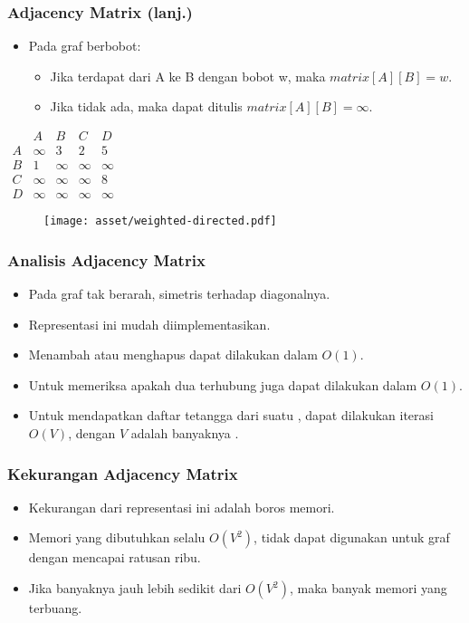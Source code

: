 \begin{frame}
\frametitle{Adjacency Matrix (lanj.)}
\begin{itemize}
  \item Pada graf berbobot:
  \begin{itemize}
    \item Jika terdapat \fedge dari A ke B dengan bobot w, maka $matrix[A][B] = w$. 
    \item Jika tidak ada, maka dapat ditulis $matrix[A][B] = \infty$.
  \end{itemize}
\end{itemize}

\begin{center}
\begin{multicols}{2}
  $\begin{array}{c|cccc}
      & A & B & C & D \\ \hline
    A & \infty & 3 & 2 & 5 \\
    B & 1 & \infty & \infty & \infty \\
    C & \infty & \infty & \infty & 8 \\
    D & \infty & \infty & \infty & \infty
  \end{array}$
  \break
  \begin{figure}
    \texttt{[image: asset/weighted-directed.pdf]}
  \end{figure}
\end{multicols} 
\end{center}
\end{frame}

\begin{frame}
\frametitle{Analisis Adjacency Matrix}
\begin{itemize}
  \item Pada graf tak berarah, \fadjacencymatrix simetris terhadap diagonalnya.
  \item Representasi ini mudah diimplementasikan.
  \item Menambah atau menghapus \fedge dapat dilakukan dalam $O(1)$.
  \item Untuk memeriksa apakah dua \fnode terhubung juga dapat dilakukan dalam $O(1)$.
  \item Untuk mendapatkan daftar tetangga dari suatu \fnode, dapat dilakukan iterasi $O(V)$, dengan $V$ adalah banyaknya \fnode.
\end{itemize}
\end{frame}

\begin{frame}
\frametitle{Kekurangan Adjacency Matrix}
\begin{itemize}
  \item Kekurangan dari representasi ini adalah boros memori.
  \item Memori yang dibutuhkan selalu $O(V^2)$, tidak dapat digunakan untuk graf dengan \fnode mencapai ratusan ribu.
  \item Jika banyaknya \fedge jauh lebih sedikit dari $O(V^2)$, maka banyak memori yang terbuang.
\end{itemize}
\end{frame}

